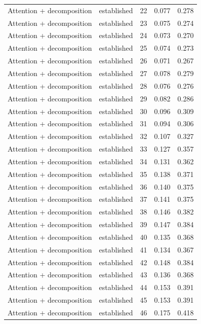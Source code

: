 \begin{tabular}{llrrr}
Attention + decomposition & established & 22 & 0.077 & 0.278 \\
Attention + decomposition & established & 23 & 0.075 & 0.274 \\
Attention + decomposition & established & 24 & 0.073 & 0.270 \\
Attention + decomposition & established & 25 & 0.074 & 0.273 \\
Attention + decomposition & established & 26 & 0.071 & 0.267 \\
Attention + decomposition & established & 27 & 0.078 & 0.279 \\
Attention + decomposition & established & 28 & 0.076 & 0.276 \\
Attention + decomposition & established & 29 & 0.082 & 0.286 \\
Attention + decomposition & established & 30 & 0.096 & 0.309 \\
Attention + decomposition & established & 31 & 0.094 & 0.306 \\
Attention + decomposition & established & 32 & 0.107 & 0.327 \\
Attention + decomposition & established & 33 & 0.127 & 0.357 \\
Attention + decomposition & established & 34 & 0.131 & 0.362 \\
Attention + decomposition & established & 35 & 0.138 & 0.371 \\
Attention + decomposition & established & 36 & 0.140 & 0.375 \\
Attention + decomposition & established & 37 & 0.141 & 0.375 \\
Attention + decomposition & established & 38 & 0.146 & 0.382 \\
Attention + decomposition & established & 39 & 0.147 & 0.384 \\
Attention + decomposition & established & 40 & 0.135 & 0.368 \\
Attention + decomposition & established & 41 & 0.134 & 0.367 \\
Attention + decomposition & established & 42 & 0.148 & 0.384 \\
Attention + decomposition & established & 43 & 0.136 & 0.368 \\
Attention + decomposition & established & 44 & 0.153 & 0.391 \\
Attention + decomposition & established & 45 & 0.153 & 0.391 \\
Attention + decomposition & established & 46 & 0.175 & 0.418 \\

\end{tabular}
